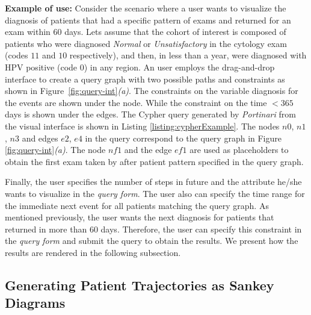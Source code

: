 \documentclass[10pt, conference]{IEEEtran}
\begin{document}
\noindent \textbf{Example of use:} Consider the  scenario where a user wants to visualize the diagnosis of patients that had a specific pattern of exams and returned for an exam within $60$ days.
Lets assume that the cohort of interest is composed of patients who were diagnosed \textit{Normal} or \textit{Unsatisfactory} in the cytology exam (codes $11$ and $10$ respectively), and then, in less than a year, were diagnosed with HPV positive (code $0$) in any region.  An user employs the drag-and-drop interface to create a query graph with two possible paths  and constraints as shown in Figure~\ref{fig:query-int}\textit{(a)}. The constraints on the variable diagnosis for the events are shown under the node. While the constraint on the time $<365$ days is shown under the edges. The Cypher query generated by \textit{Portinari} from the visual interface is shown in Listing \ref{listing:cypherExample}. The nodes $n0$, $n1$, $n3$ and edges $e2$, $e4$ in the query correspond
to the query graph in Figure \ref{fig:query-int}\textit{(a)}. The node $nf1$ and the edge $ef1$ are used as placeholders to obtain the first exam taken by after patient pattern specified in the query graph.






Finally, the user specifies the number of steps in future and the attribute he/she wants to visualize in the \textit{query form}. The user also can specify the time range for the immediate next event for all patients matching the query graph. As mentioned previously, the user wants the next diagnosis for patients that returned in more than $60$ days.  Therefore, the user can specify this constraint in the \textit{query form} and submit the query to obtain the results. We present how the results are rendered in the following subsection.

\subsection{Generating Patient Trajectories as Sankey Diagrams}
\label{sec:ri}
\end{document}
